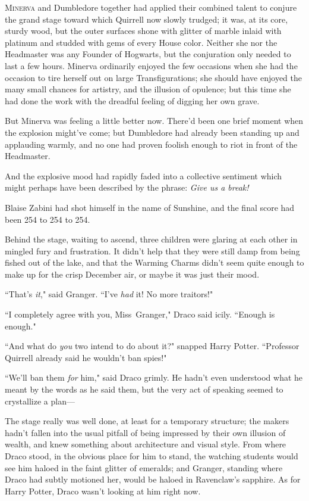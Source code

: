 
\lettrine{M}{inerva} and Dumbledore together had applied their combined talent to conjure the grand stage toward which Quirrell now slowly trudged; it was, at its core, sturdy wood, but the outer surfaces shone with glitter of marble inlaid with platinum and studded with gems of every House color. Neither she nor the Headmaster was any Founder of Hogwarts, but the conjuration only needed to last a few hours. Minerva ordinarily enjoyed the few occasions when she had the occasion to tire herself out on large Transfigurations; she should have enjoyed the many small chances for artistry, and the illusion of opulence; but this time she had done the work with the dreadful feeling of digging her own grave.

But Minerva was feeling a little better now. There'd been one brief moment when the explosion might've come; but Dumbledore had already been standing up and applauding warmly, and no one had proven foolish enough to riot in front of the Headmaster.

And the explosive mood had rapidly faded into a collective sentiment which might perhaps have been described by the phrase: \emph{Give us a break!}

Blaise Zabini had shot himself in the name of Sunshine, and the final score had been 254 to 254 to 254.

\later

Behind the stage, waiting to ascend, three children were glaring at each other in mingled fury and frustration. It didn't help that they were still damp from being fished out of the lake, and that the Warming Charms didn't seem quite enough to make up for the crisp December air, or maybe it was just their mood.

``That's \emph{it}," said Granger. ``I've \emph{had} it! No more traitors!"

``I completely agree with you, Miss~Granger," Draco said icily. ``Enough is enough."

``And what do \emph{you} two intend to do about it?" snapped Harry Potter. ``Professor Quirrell already said he wouldn't ban spies!"

``We'll ban them \emph{for} him," said Draco grimly. He hadn't even understood what he meant by the words as he said them, but the very act of speaking seemed to crystallize a plan---

\later

The stage really was well done, at least for a temporary structure; the makers hadn't fallen into the usual pitfall of being impressed by their own illusion of wealth, and knew something about architecture and visual style. From where Draco stood, in the obvious place for him to stand, the watching students would see him haloed in the faint glitter of emeralds; and Granger, standing where Draco had subtly motioned her, would be haloed in Ravenclaw's sapphire. As for Harry Potter, Draco wasn't looking at him right now.

